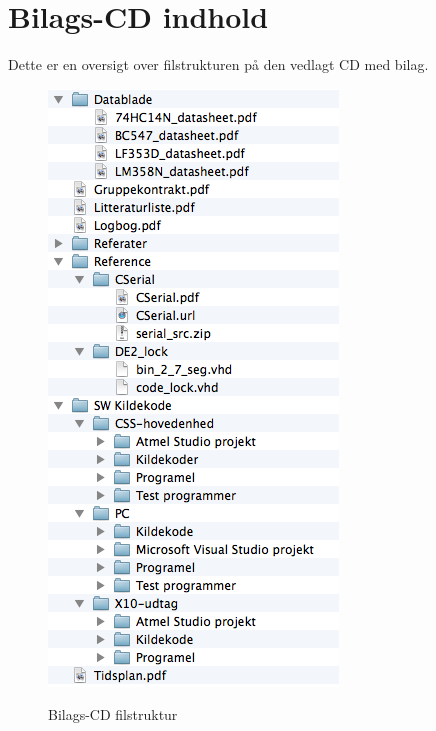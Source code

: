 \chapter{Bilags-CD indhold}
Dette er en oversigt over filstrukturen på den vedlagt CD med bilag.

\begin{figure}[!htb]
	 \centering     
     {\includegraphics[height=0.7\textheight]{billeder/CD-filstruktur}}
     \caption{Bilags-CD filstruktur}
     \label{fig:PC_package}
\end{figure}